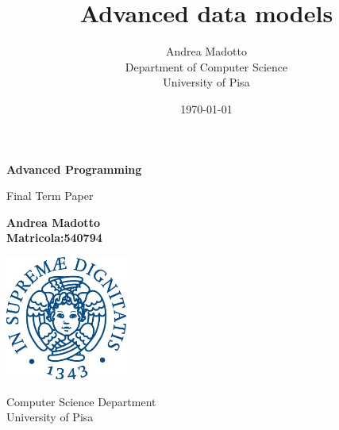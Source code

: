 \documentclass[10pt]{article}
\title{Advanced data models}
\author{
        Andrea Madotto\\
                Department of Computer Science\\
        University of Pisa\\
}
\date{\today}
\begin{document}
\begin{titlepage}
    \begin{center}
        \vspace*{1cm}
        \Large
        \textbf{Advanced Programming}
        
        \vspace{0.5cm}
        Final Term Paper
        
        \vspace{1.5cm}
        
        \textbf{Andrea Madotto\\\bigskip
        Matricola:540794}
        
        \vspace{1.5cm}
		
        \includegraphics[width=0.3\textwidth]{university.jpeg}
        \vspace{1.5cm}
 
        \Large
        Computer Science Department \\
        University of Pisa\\

        
    \end{center}
\end{titlepage}
\end{document}
